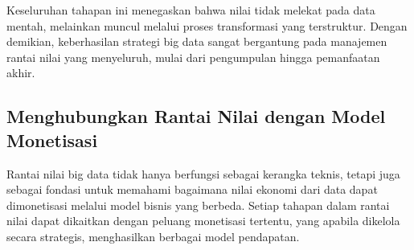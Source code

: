 Keseluruhan tahapan ini menegaskan bahwa nilai tidak melekat pada data mentah, melainkan muncul melalui proses transformasi yang terstruktur. Dengan demikian, keberhasilan strategi big data sangat bergantung pada manajemen rantai nilai yang menyeluruh, mulai dari pengumpulan hingga pemanfaatan akhir.

\subsection{Menghubungkan Rantai Nilai dengan Model Monetisasi}

Rantai nilai big data tidak hanya berfungsi sebagai kerangka teknis, tetapi juga sebagai fondasi untuk memahami bagaimana nilai ekonomi dari data dapat dimonetisasi melalui model bisnis yang berbeda. Setiap tahapan dalam rantai nilai dapat dikaitkan dengan peluang monetisasi tertentu, yang apabila dikelola secara strategis, menghasilkan berbagai model pendapatan.

